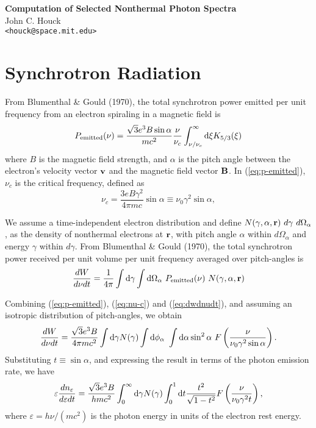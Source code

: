 \documentclass[12pt]{article}
\newcommand{\D}{{\rm d}}
\begin{document}
\begin{center}
{\Large\bf
Computation of Selected Nonthermal Photon Spectra}\\
\large
John C. Houck \\
\verb|<houck@space.mit.edu>|
\end{center}

\section{Synchrotron Radiation}

From Blumenthal \& Gould (1970),
the total synchrotron power emitted per unit frequency
from an electron spiraling in a magnetic field is
\begin{equation}
P_{\rm emitted}(\nu) =
\frac{\sqrt{3} e^3 B \sin\alpha}{mc^2}
\frac{\nu}{\nu_c} \int_{\nu/\nu_c}^\infty \D\xi K_{5/3}(\xi)
\label{eq:p-emitted}
\end{equation}
where $B$ is the magnetic field strength, and
$\alpha$ is the pitch angle between the electron's velocity
vector ${\bf v}$ and the magnetic field vector ${\bf B}$.
In (\ref{eq:p-emitted}), $\nu_c$ is the critical frequency, defined as
\begin{equation}
  \nu_c = \frac{3eB\gamma^2}{4\pi m c} \sin\alpha
  \equiv \nu_0 \gamma^2 \sin\alpha,
\label{eq:nu-c}
\end{equation}

We assume a time-independent electron distribution and define
$N(\gamma, \alpha, {\bf r})~d\gamma~d\Omega_\alpha$, as the
density of nonthermal electrons at ${\bf r}$, with pitch angle
$\alpha$ within $d\Omega_\alpha$ and energy $\gamma$ within
$d\gamma$. From Blumenthal \& Gould (1970), the total
synchrotron power received per unit volume per unit frequency
averaged over pitch-angles is
\begin{equation}
\frac{dW}{d\nu dt} = \frac{1}{4\pi}\int \D\gamma \int \D\Omega_\alpha~
              P_{\rm emitted}(\nu)~N(\gamma, \alpha, {\bf r})
\label{eq:dwdnudt}
\end{equation}

Combining (\ref{eq:p-emitted}), (\ref{eq:nu-c}) and
(\ref{eq:dwdnudt}), and assuming an isotropic distribution
of pitch-angles, we obtain
\begin{equation}
\frac{dW}{d\nu dt} =
\frac{\sqrt{3} e^3 B}{4\pi mc^2}
\int \D\gamma N(\gamma) \int \D\phi_\alpha~ \int \D\alpha
\sin^2\alpha ~F\left(\frac{\nu}{\nu_0\gamma^2\sin\alpha}\right).
\end{equation}
Substituting $t\equiv \sin\alpha$, and
expressing the result in terms of the photon emission rate, we have
\begin{equation}
\varepsilon\frac{dn_\varepsilon}{d\varepsilon dt} =
\frac{\sqrt{3} e^3 B}{hmc^2}
\int_0^\infty \D\gamma N(\gamma) \int_0^1 \D t
\frac{t^2}{\sqrt{1 - t^2}} F\left(\frac{\nu}{\nu_0\gamma^2 t}\right),
\label{eq:sync-emis1}
\end{equation}
where $\varepsilon = h\nu/(mc^2)$ is the photon energy in units
of the electron rest energy.
\end{document}
